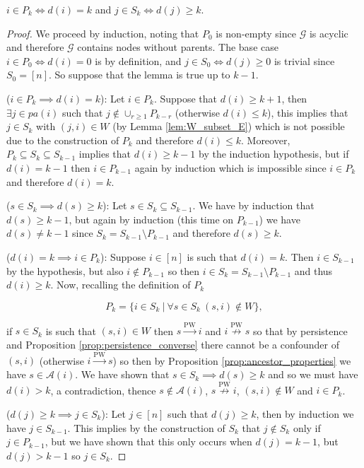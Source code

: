 \documentclass[12pt]{article}
\def\pwgc{\overset{\text{PW}}{\rightarrow}}  %
\def\npwgc{\overset{\text{PW}}{\nrightarrow}}  %
\def\gcg{\mathcal{G}}  %
\newcommand{\pa}[1]{pa(#1)}  %
\newcommand{\anc}[1]{\mathcal{A}(#1)}  %
\begin{document}
\begin{lemma}
  \label{lem:depth_lemma}
  $i \in P_k \iff d(i) = k$ and $j \in S_k \iff d(j) \ge k$.
\end{lemma}
\begin{proof}
  We proceed by induction, noting that $P_0$ is non-empty since $\gcg$
  is acyclic and therefore $\gcg$ contains nodes without parents.  The
  base case $i \in P_0 \iff d(i) = 0$ is by definition, and
  $j \in S_0 \iff d(j) \ge 0$ is trivial since $S_0 = [n]$.  So
  suppose that the lemma is true up to $k - 1$.

  ($i \in P_k \implies d(i) = k$): Let $i \in P_k$.  Suppose that
  $d(i) \ge k + 1$, then $\exists j \in \pa{i}$ such that
  $j \not\in \cup_{r \ge 1}P_{k - r}$ (otherwise $d(i) \le k$), this
  implies that $j \in S_k$ with $(j, i) \in W$ (by Lemma
  \ref{lem:W_subset_E}) which is not possible due to the construction of
  $P_k$ and therefore $d(i) \le k$.  Moreover,
  $P_k \subseteq S_k \subseteq S_{k - 1}$ implies that
  $d(i) \ge k - 1$ by the induction hypothesis, but if $d(i) = k - 1$
  then $i \in P_{k - 1}$ again by induction which is impossible since
  $i \in P_k$ and therefore $d(i) = k$.

  ($s \in S_k \implies d(s) \ge k$): Let
  $s \in S_k \subseteq S_{k - 1}$.  We have by induction that
  $d(s) \ge k - 1$, but again by induction (this time on $P_{k - 1}$)
  we have $d(s) \ne k - 1$ since $S_k = S_{k - 1} \setminus P_{k - 1}$
  and therefore $d(s) \ge k$.

  ($d(i) = k \implies i \in P_k$): Suppose $i \in [n]$ is such that
  $d(i) = k$.  Then $i \in S_{k - 1}$ by the hypothesis, but also
  $i \not\in P_{k - 1}$ so then
  $i \in S_k = S_{k - 1} \setminus P_{k - 1}$ and thus $d(i) \ge k$.
  Now, recalling the definition of $P_k$

  \begin{equation*}
    P_k = \{i \in S_k\ |\ \forall s \in S_k\ (s, i) \not\in W \},
  \end{equation*}

  if $s \in S_k$ is such that $(s, i) \in W$ then $s \pwgc i$ and
  $i \npwgc s$ so that by persistence and Proposition
  \ref{prop:persistence_converse} there cannot be a confounder of
  $(s, i)$ (otherwise $i \pwgc s$) so then by Proposition
  \ref{prop:ancestor_properties} we have $s \in \anc{i}$.  We have
  shown that $s \in S_k \implies d(s) \ge k$ and so we must have
  $d(i) > k$, a contradiction, thence $s \not\in \anc{i}$,
  $s \npwgc i$, $(s, i) \not\in W$ and $i \in P_k$.

  ($d(j) \ge k \implies j \in S_k$): Let $j \in [n]$ such that
  $d(j) \ge k$, then by induction we have $j \in S_{k - 1}$.  This
  implies by the construction of $S_k$ that $j \not\in S_k$ only if
  $j \in P_{k - 1}$, but we have shown that this only occurs when
  $d(j) = k - 1$, but $d(j) > k - 1$ so $j \in S_k$.
\end{proof}
\end{document}
